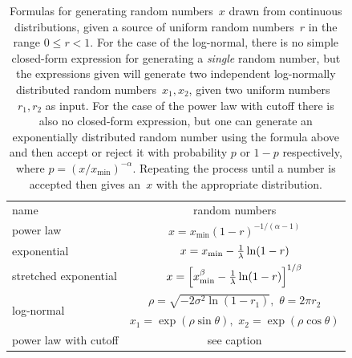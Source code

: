 \documentclass[final]{siamltex}
\newcommand{\xmin}{\ensuremath{x_{\min}}}
\begin{document}
\begin{appendix}
\begin{table}
\setlength{\tabcolsep}{4pt}
\begin{center}
\begin{tabular}{l|c}
\multirow{2}{*}{name} & \multirow{2}{*}{random numbers} \\
                     &                                 \\
\hline\hline
   \multirow{2}{5em}{power law}
 & \multirow{2}{*}{$x=\xmin(1-r)^{-1/(\alpha-1)}$} \\
& \\
\hline
   \multirow{2}{5em}{exponential}
 & \multirow{2}{*}{$x = \xmin - {1\over\lambda} \ln (1-r)$} \\
& \\
\hline
   \multirow{2}{5em}{stretched exponential}
 & \multirow{2}{*}{$x = \Bigl[ \xmin^\beta - {1\over\lambda} \ln (1-r)
                    \Bigr]^{1/\beta}$} \\
& \\
\hline
   \multirow{2}{5em}{log-normal}
 & $\scriptstyle \rho=\sqrt{-2\sigma^2\ln(1-r_1)},$ $\scriptstyle \theta=2\pi r_2$ \\
 & $\scriptstyle x_1=\exp(\rho\sin\theta),$ $\scriptstyle x_2=\exp(\rho\cos\theta)$ \\
\hline
   \multirow{2}{5em}{power law with cutoff}
 & \multirow{2}{*}{see caption} \\
& \\
\end{tabular}
\end{center}
\caption{Formulas for generating random numbers~$x$ drawn from continuous
 distributions, given a source of uniform random numbers~$r$ in the range
 $0\le r<1$.  For the case of the log-normal, there is no simple
 closed-form expression for generating a \emph{single} random number,
 but the expressions given will generate two
 independent log-normally distributed random numbers~$x_1,x_2$, given two
 uniform numbers~$r_1,r_2$ as input.  For the case of the power law with
 cutoff there is also no closed-form expression, but one can generate an
 exponentially distributed random number using the formula above and then
 accept or reject it with probability $p$ or $1-p$ respectively, where
 $p=(x/\xmin)^{-\alpha}$.  Repeating the process until a number is accepted
 then gives an~$x$ with the appropriate distribution.}
\label{table:rng}
\end{table}
%


\end{appendix}
\end{document}

